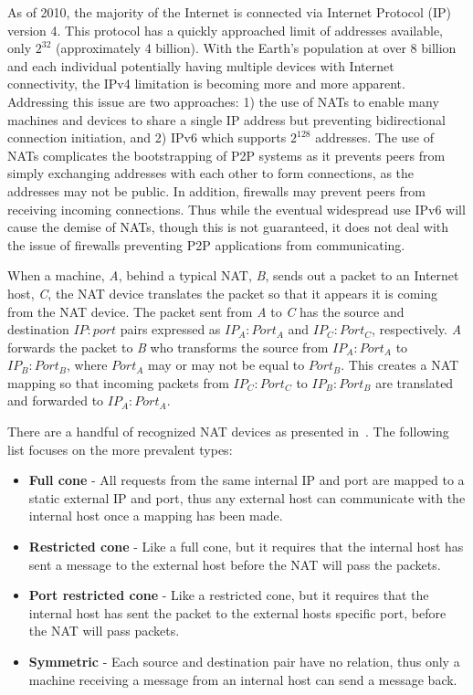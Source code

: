 \documentclass[conference]{IEEEtran}
\begin{document}
As of 2010, the majority of the Internet is connected via Internet Protocol
(IP) version 4.  This protocol has a quickly approached limit of addresses
available,  only $2^{32}$ (approximately 4 billion).  With the Earth's
population at over 8 billion and each individual potentially having multiple
devices with Internet connectivity, the IPv4 limitation is becoming more and
more apparent.  Addressing this issue are two approaches:  1) the use of NATs
to enable many machines and devices to share a single IP address but preventing
bidirectional connection initiation, and 2) IPv6 which supports $2^{128}$
addresses.  The use of NATs complicates the bootstrapping of P2P systems as it
prevents peers from simply exchanging addresses with each other to form
connections, as the addresses may not be public.  In addition, firewalls may
prevent peers from receiving incoming connections.  Thus while the eventual
widespread use IPv6 will cause the demise of NATs, though this is not
guaranteed, it does not deal with the issue of firewalls preventing P2P
applications from communicating.

When a machine, \textit{A}, behind a typical NAT, \textit{B}, sends out a
packet to an Internet host, \textit{C}, the NAT device translates the packet so
that it appears it is coming from the NAT device.  The packet sent from
\textit{A} to \textit{C} has the source and destination $IP:port$ pairs
expressed as $IP_A:Port_A$ and $IP_C:Port_C$, respectively.  \textit{A}
forwards the packet to \textit{B} who transforms the source from $IP_A:Port_A$
to $IP_B:Port_B$, where $Port_A$ may or may not be equal to $Port_B$.  This
creates a NAT mapping so that incoming packets from $IP_C:Port_C$ to
$IP_B:Port_B$ are translated and forwarded to $IP_A:Port_A$.

There are a handful of recognized NAT devices as presented in~\cite{stun,
p2p_nats_rfc}.  The following list focuses on the more prevalent types:
\begin{itemize}
\item \textbf{Full cone} - All requests from the same internal IP and port are
mapped to a static external IP and port, thus any external host can communicate
with the internal host once a mapping has been made.
\item \textbf{Restricted cone} - Like a full cone, but it requires that the
internal host has sent a message to the external host before the NAT will pass
the packets.
\item \textbf{Port restricted cone} - Like a restricted cone, but it requires
that the internal host has sent the packet to the external hosts specific port,
before the NAT will pass packets.
\item \textbf{Symmetric} - Each source and destination pair have no relation,
thus only a machine receiving a message from an internal host can send a
message back.
\end{itemize}
\end{document}
